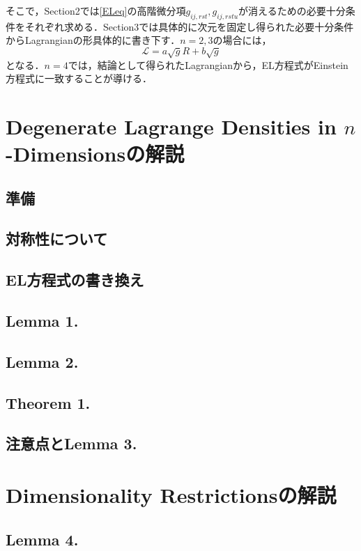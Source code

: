 \documentclass[12pt, a4paper]{jsarticle}
\begin{document}
そこで，Section2では\eqref{ELeq}の高階微分項\(g_{ij,rst}, g_{ij,rstu} \)が消えるための必要十分条件をそれぞれ求める．Section3では具体的に次元を固定し得られた必要十分条件からLagrangianの形具体的に書き下す．\(n=2,3\)の場合には，
\begin{equation*}
  \mathscr{L} = a\sqrt{g}R + b \sqrt{g}
  \tag{3.1} \label{n=2,3}
\end{equation*}
となる．\(n=4\)では，結論として得られたLagrangianから，EL方程式がEinstein方程式に一致することが導ける．
\section{Degenerate Lagrange Densities in \(n\)-Dimensionsの解説}
\subsection{準備}

\subsection{対称性について}

\subsection{EL方程式の書き換え}

\subsection{Lemma 1.}

\subsection{Lemma 2.}

\subsection{Theorem 1.}

\subsection{注意点とLemma 3.}
\section{Dimensionality Restrictionsの解説}

\subsection{Lemma 4.}
\end{document}
